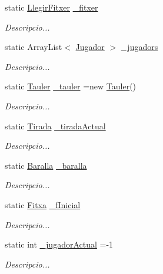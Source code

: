 \begin{DoxyCompactItemize}
\item 
static \mbox{\hyperlink{class_llegir_fitxer}{Llegir\+Fitxer}} \mbox{\hyperlink{class_joc_af07590c09ae2ebda3bf6ca1a4171063b}{\+\_\+fitxer}}
\begin{DoxyCompactList}\small\item\em Descripcio... \end{DoxyCompactList}\item 
static Array\+List$<$ \mbox{\hyperlink{class_jugador}{Jugador}} $>$ \mbox{\hyperlink{class_joc_a30a9ea3f0be1aee222a22fede9130cb8}{\+\_\+jugadors}}
\begin{DoxyCompactList}\small\item\em Descripcio... \end{DoxyCompactList}\item 
static \mbox{\hyperlink{class_tauler}{Tauler}} \mbox{\hyperlink{class_joc_a0e45f68f18198669176e3f46b05a41ac}{\+\_\+tauler}} =new \mbox{\hyperlink{class_tauler}{Tauler}}()
\begin{DoxyCompactList}\small\item\em Descripcio... \end{DoxyCompactList}\item 
static \mbox{\hyperlink{class_tirada}{Tirada}} \mbox{\hyperlink{class_joc_a6713774e2d5d01daaef695af3cb55474}{\+\_\+tirada\+Actual}}
\begin{DoxyCompactList}\small\item\em Descripcio... \end{DoxyCompactList}\item 
static \mbox{\hyperlink{class_baralla}{Baralla}} \mbox{\hyperlink{class_joc_a9d7c9ceefbdca067a0d82fa5f6806aaa}{\+\_\+baralla}}
\begin{DoxyCompactList}\small\item\em Descripcio... \end{DoxyCompactList}\item 
static \mbox{\hyperlink{class_fitxa}{Fitxa}} \mbox{\hyperlink{class_joc_a9118adfa2c6c65ce5b759ed914801950}{\+\_\+f\+Inicial}}
\begin{DoxyCompactList}\small\item\em Descripcio... \end{DoxyCompactList}\item 
static int \mbox{\hyperlink{class_joc_a58dad008aa898ed0af6827ef7da50083}{\+\_\+jugador\+Actual}} =-\/1
\begin{DoxyCompactList}\small\item\em Descripcio... \end{DoxyCompactList}\end{DoxyCompactItemize}


